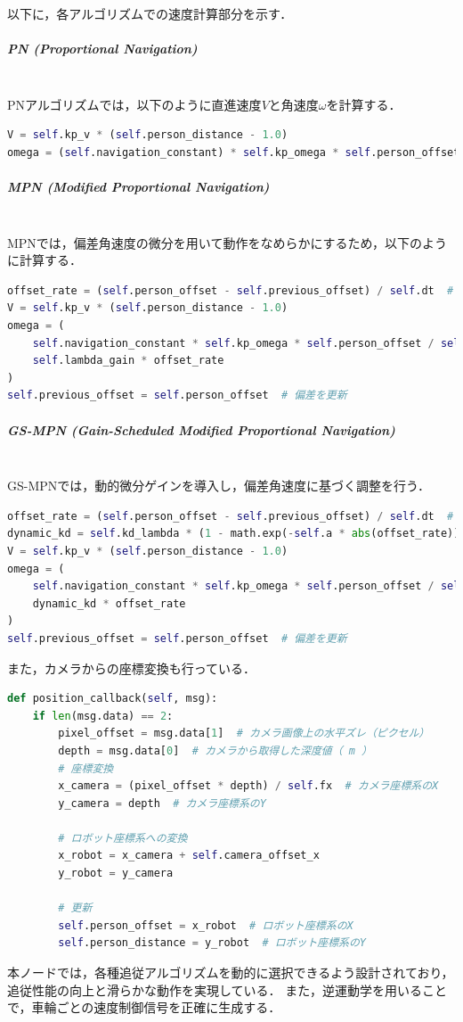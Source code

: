以下に，各アルゴリズムでの速度計算部分を示す．

\subparagraph{PN (Proportional Navigation)}\mbox{}\\
PNアルゴリズムでは，以下のように直進速度$V$と角速度$\omega$を計算する．
\begin{lstlisting}[language=Python, caption=PNの計算部分 (Roboware\_node\_np.py)]
V = self.kp_v * (self.person_distance - 1.0)
omega = (self.navigation_constant) * self.kp_omega * self.person_offset / max((self.person_distance), 1.0)
\end{lstlisting}

\subparagraph{MPN (Modified Proportional Navigation)}\mbox{}\\
MPNでは，偏差角速度の微分を用いて動作をなめらかにするため，以下のように計算する．
\begin{lstlisting}[language=Python, caption=MPNの計算部分 (Roboware\_node\_mpn.py)]
offset_rate = (self.person_offset - self.previous_offset) / self.dt  # 偏差角速度
V = self.kp_v * (self.person_distance - 1.0)
omega = (
    self.navigation_constant * self.kp_omega * self.person_offset / self.person_distance +
    self.lambda_gain * offset_rate
)
self.previous_offset = self.person_offset  # 偏差を更新
\end{lstlisting}

\subparagraph{GS-MPN (Gain-Scheduled Modified Proportional Navigation)}\mbox{}\\
GS-MPNでは，動的微分ゲインを導入し，偏差角速度に基づく調整を行う．
\begin{lstlisting}[language=Python, caption=GS-MPNの計算部分 (Roboware\_node\_newmpn.py)]
offset_rate = (self.person_offset - self.previous_offset) / self.dt  # 偏差角速度
dynamic_kd = self.kd_lambda * (1 - math.exp(-self.a * abs(offset_rate))) / (1 + math.exp(-self.a * abs(offset_rate)))
V = self.kp_v * (self.person_distance - 1.0)
omega = (
    self.navigation_constant * self.kp_omega * self.person_offset / self.person_distance +
    dynamic_kd * offset_rate
)
self.previous_offset = self.person_offset  # 偏差を更新
\end{lstlisting}


また，カメラからの座標変換も行っている．
\begin{lstlisting}[language=Python, caption=座標変換]
def position_callback(self, msg):
    if len(msg.data) == 2:  
        pixel_offset = msg.data[1]  # カメラ画像上の水平ズレ（ピクセル）
        depth = msg.data[0]  # カメラから取得した深度値（ m ）
        # 座標変換
        x_camera = (pixel_offset * depth) / self.fx  # カメラ座標系のX
        y_camera = depth  # カメラ座標系のY

        # ロボット座標系への変換
        x_robot = x_camera + self.camera_offset_x
        y_robot = y_camera

        # 更新
        self.person_offset = x_robot  # ロボット座標系のX
        self.person_distance = y_robot  # ロボット座標系のY
\end{lstlisting}

本ノードでは，各種追従アルゴリズムを動的に選択できるよう設計されており，追従性能の向上と滑らかな動作を実現している．
また，逆運動学を用いることで，車輪ごとの速度制御信号を正確に生成する．
